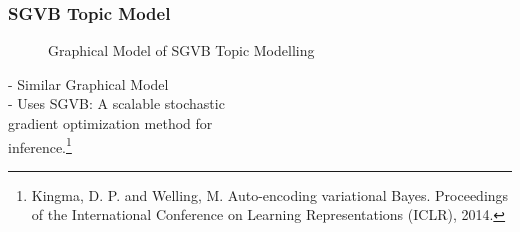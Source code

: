 \documentclass{beamer}
\begin{document}
\begin{frame}
\frametitle{SGVB Topic Model}
\begin{figure}
  \centering

\caption{Graphical Model of SGVB Topic Modelling}
\label{sgvb_topic}
\end{figure}

- Similar Graphical Model \\
- Uses SGVB: A scalable stochastic \\
\hspace{5mm} gradient optimization method for \\
\hspace{5mm} inference.\footnote{Kingma, D. P. and Welling, M. Auto-encoding variational
Bayes. Proceedings of the International Conference on
Learning Representations (ICLR), 2014.}
\vspace{100mm}
\end{frame}
\end{document}
